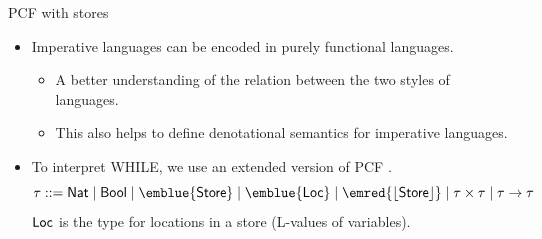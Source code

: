 \documentclass[paper=screen,mode=present,style=zysimple]{powerdot}
\begin{document}
\begin{slide}{PCF with stores}
\begin{itemize}
\item Imperative languages can be encoded in purely functional languages. \\
\begin{itemize}
\item A better understanding of the relation between the two styles of languages. \\
\item This also helps to define denotational semantics for imperative languages.
\vspace*{-0.5em}
\end{itemize}
\item To interpret WHILE, we use an extended version of PCF .
\[
\tau ::= \tnat \mid \tbool \mid \emblue{\tstore} \mid \emblue{\tloc} \mid \emred{\tlift{\tstore}}
\mid \tau \times \tau \mid \tau \to \tau
\]
$\mathsf{Loc}$ is the type for locations in a store (L-values of variables). \\[0.3em]
\end{itemize}
\end{slide}
\end{document}
